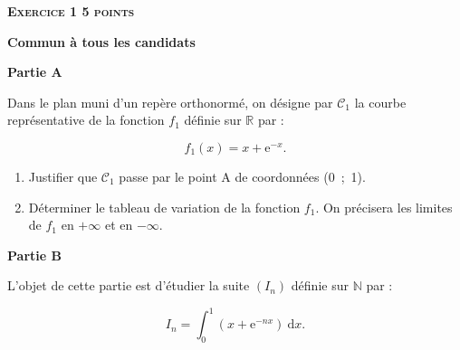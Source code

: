 \documentclass[10pt]{article}
\newcommand{\R}{\mathbb{R}}
\newcommand{\N}{\mathbb{N}}
\begin{document}
\vspace{0,5cm}

\textbf{\textsc{Exercice 1 \hfill 5 points}}

\textbf{Commun à tous les candidats} 

\medskip

\textbf{Partie A} 

\medskip

Dans le plan muni d'un repère orthonormé, on désigne par  $\mathcal{C}_1$ la courbe représentative de la fonction $f_1$  définie sur $\R$ par : 

\[f_1(x) = x +  \text{e}^{-x}.\]

\begin{enumerate}
\item  Justifier que $\mathcal{C}_1$ passe par le point A de coordonnées (0~;~1). 
\item  Déterminer le tableau de variation de la fonction $f_1$. On précisera les limites de $f_1$ en $+ \infty$ et en $- \infty$. 
\end{enumerate}

\bigskip

\textbf{Partie B}

\medskip

L’objet de cette partie est d'étudier la suite $\left(I_n\right)$ définie sur $\N$ par : 

\[I_n = \int_0^1 \left(x + \text{e}^{- nx}\right)\:\text{d}x.\] 
\end{document}
